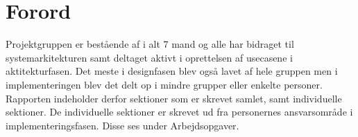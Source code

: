 \chapter{Forord}
\label{ch:Forord}

Projektgruppen er bestående af i alt 7 mand og alle har bidraget til systemarkitekturen samt deltaget aktivt i oprettelsen af usecasene i aktitekturfasen. Det meste i designfasen blev også lavet af hele gruppen men i implementeringen blev det delt op i mindre grupper eller enkelte personer. Rapporten indeholder derfor sektioner som er skrevet samlet, samt individuelle sektioner. De individuelle sektioner er skrevet ud fra personernes ansvarsområde i implementeringsfasen. Disse ses under Arbejdsopgaver.  

\clearpage